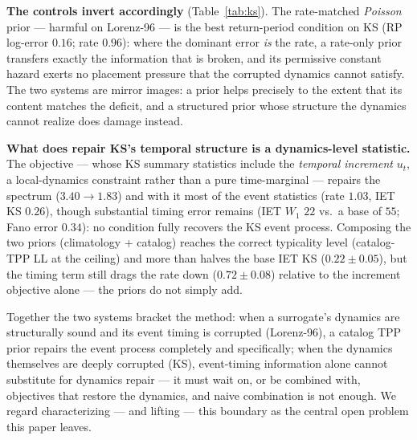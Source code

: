 \documentclass[11pt]{article}
\begin{document}
\textbf{The controls invert accordingly} (Table~\ref{tab:ks}). The
rate-matched \emph{Poisson} prior --- harmful on Lorenz-96 --- is the best
return-period condition on KS (RP log-error $0.16$; rate $0.96$): where
the dominant error \emph{is} the rate, a rate-only prior transfers exactly
the information that is broken, and its permissive constant hazard exerts
no placement pressure that the corrupted dynamics cannot satisfy. The two
systems are mirror images: a prior helps precisely to the extent that its
content matches the deficit, and a structured prior whose structure the
dynamics cannot realize does damage instead.

\textbf{What does repair KS's temporal structure is a dynamics-level
statistic.} The \citet{jiang2023training} objective --- whose KS summary
statistics include the \emph{temporal increment} $u_t$, a local-dynamics
constraint rather than a pure time-marginal --- repairs the spectrum
($3.40 \to 1.83$) and with it most of the event statistics (rate $1.03$,
IET KS $0.26$), though substantial timing error remains (IET $W_1$ $22$
vs.\ a base of $55$; Fano error $0.34$): no condition fully recovers the
KS event process. Composing the two priors (climatology + catalog)
reaches the correct typicality level (catalog-TPP LL at the ceiling) and
more than halves the base IET KS ($0.22 \pm 0.05$), but the timing term
still drags the rate down ($0.72 \pm 0.08$) relative to the increment
objective alone --- the priors do not simply add.

\begin{table}[t]
\centering
\caption{Kuramoto--Sivashinsky results (3 seeds). Ground-truth
catalog-TPP ceiling: $-0.050$. The
timing-only prior collapses the event rate; the rate-only (Poisson) prior
--- harmful on Lorenz-96 --- is here the best return-period condition;
increment statistics ($u_t$) repair the dynamics and most of the timing.}
\label{tab:ks}
\resizebox{\textwidth}{!}{}
\end{table}

Together the two systems bracket the method: when a surrogate's dynamics
are structurally sound and its event timing is corrupted (Lorenz-96), a
catalog TPP prior repairs the event process completely and specifically;
when the dynamics themselves are deeply corrupted (KS), event-timing
information alone cannot substitute for dynamics repair --- it must wait
on, or be combined with, objectives that restore the dynamics, and naive
combination is not enough. We regard characterizing --- and lifting ---
this boundary as the central open problem this paper leaves.
\end{document}
